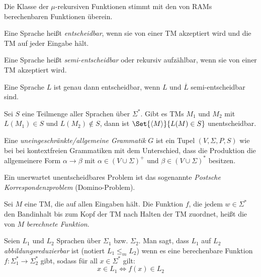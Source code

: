 \documentclass{cheat-sheet}
\begin{document}
\begin{bem}
Die Klasse der $\mu$-rekursiven Funktionen stimmt mit den von RAMs berechenbaren Funktionen überein.
\end{bem}

\begin{defn}
Eine Sprache heißt \emph{entscheidbar}, wenn sie von einer TM akzeptiert wird und die TM auf jeder Eingabe hält.
\end{defn}

\begin{defn}
Eine Sprache heißt \emph{semi-entscheidbar} oder rekursiv aufzählbar, wenn sie von einer TM akzeptiert wird.
\end{defn}

\begin{satz}
Eine Sprache $L$ ist genau dann entscheidbar, wenn $L$ und $\overline{L}$ semi-entscheidbar sind.
\end{satz}

\begin{satz}
Sei $S$ eine Teilmenge aller Sprachen über $\Sigma^{*}$. Gibt es TMs $M_{1}$ und $M_{2}$ mit $L(M_{1}) \in S$ und $L(M_{2}) \not\in S$, dann ist $\Set{ \langle M \rangle }{ L(M) \in S }$ unentscheidbar.
\end{satz}

\begin{defn}
Eine \emph{uneingeschränkte/allgemeine Grammatik} $G$ ist ein Tupel $(V, \Sigma, P, S)$ wie bei bei kontextfreien Grammatiken mit dem Unterschied, dass die Produktion die allgemeinere Form $\alpha \longrightarrow \beta$ mit $\alpha \in (V \cup \Sigma)^{+}$ und $\beta \in (V \cup \Sigma)^{*}$ besitzen.
\end{defn}

\begin{bem}
Ein unerwartet unentscheidbares Problem ist das sogenannte \emph{Postsche Korrespondenzproblem} (Domino-Problem).
\end{bem}

\begin{defn}
Sei $M$ eine TM, die auf allen Eingaben hält. Die Funktion $f$, die jedem $w \in \Sigma^{*}$ den Bandinhalt bis zum Kopf der TM nach Halten der TM zuordnet, heißt die von $M$ \emph{berechnete Funktion}.
\end{defn}

\begin{defn}
Seien $L_{1}$ und $L_{2}$ Sprachen über $\Sigma_{1}$ bzw. $\Sigma_{2}$. Man sagt, dass $L_{1}$ auf $L_{2}$ \emph{abbildungsreduzierbar} ist (notiert $L_{1} \le_{m} L_{2}$) wenn es eine berechenbare Funktion $f : \Sigma_{1}^{*} \to \Sigma_{2}^{*}$ gibt, sodass für all $x \in \Sigma^{*}$ gilt:
  \[ x \in L_{1} \Leftrightarrow f(x) \in L_{2} \]
\end{defn}
\end{document}
